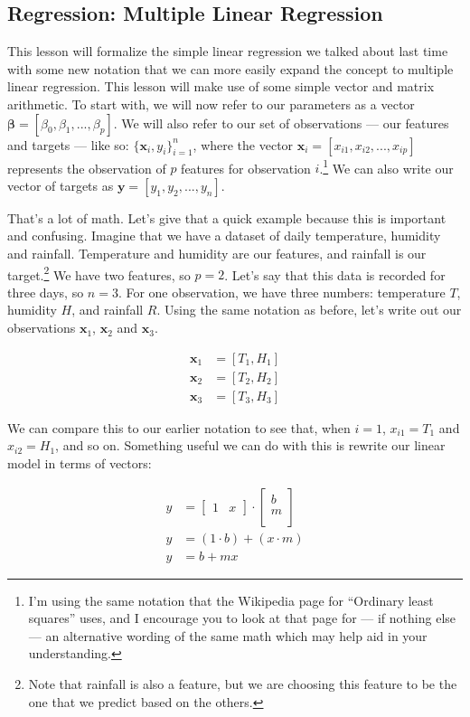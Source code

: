 \subsection*{Regression: Multiple Linear Regression}
This lesson will formalize the simple linear regression we talked about last time with some new notation that we can more easily expand the concept to multiple linear regression. This lesson will make use of some simple vector and matrix arithmetic. To start with, we will now refer to our parameters as a vector $\boldsymbol{\beta}=[\beta_0,\beta_1,...,\beta_p]$. We will also refer to our set of observations --- our features and targets --- like so: $\{\mathbf{x}_i,y_i\}_{i=1}^n$, where the vector $\mathbf{x}_i=[x_{i1},x_{i2},...,x_{ip}]$ represents the observation of $p$ features for observation $i$.\footnote{I'm using the same notation that the Wikipedia page for ``Ordinary least squares'' uses, and I encourage you to look at that page for --- if nothing else --- an alternative wording of the same math which may help aid in your understanding.} We can also write our vector of targets as $\mathbf{y}=[y_1,y_2,...,y_n]$.

That's a lot of math. Let's give that a quick example because this is important and confusing. Imagine that we have a dataset of daily temperature, humidity and rainfall. Temperature and humidity are our features, and rainfall is our target.\footnote{Note that rainfall is also a feature, but we are choosing this feature to be the one that we predict based on the others.} We have two features, so $p=2$. Let's say that this data is recorded for three days, so $n=3$. For one observation, we have three numbers: temperature $T$, humidity $H$, and rainfall $R$. Using the same notation as before, let's write out our observations $\mathbf{x}_1$, $\mathbf{x}_2$ and $\mathbf{x}_3$.

\begin{align*}
    \mathbf{x}_1&=[T_1,H_1] \\
    \mathbf{x}_2&=[T_2,H_2] \\
    \mathbf{x}_3&=[T_3,H_3]
\end{align*}

\noindent We can compare this to our earlier notation to see that, when $i=1$, $x_{i1}=T_1$ and $x_{i2}=H_1$, and so on. Something useful we can do with this is rewrite our linear model in terms of vectors:

\begin{align*}
    y &= 
    \begin{bmatrix}
        1 & x
    \end{bmatrix}
    \cdot
    \begin{bmatrix}
        b \\
        m \\
    \end{bmatrix} \\
    y &= (1 \cdot b) + (x \cdot m) \\
    y &= b + mx
\end{align*}

